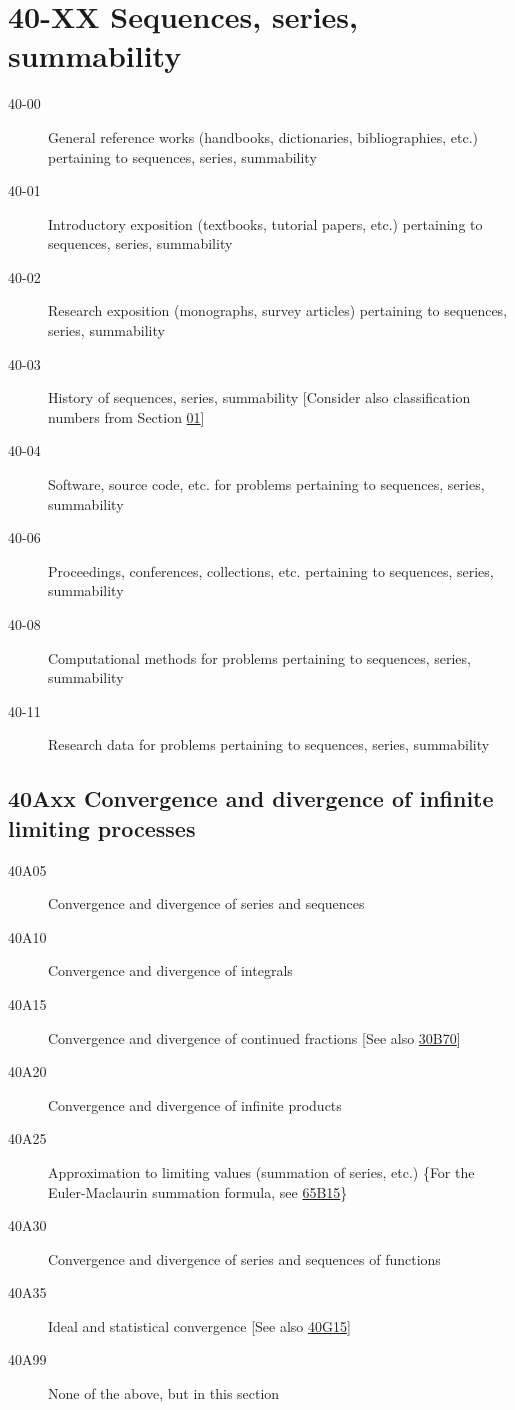\documentclass[letterpaper]{article}
\begin{document}
\section*{40-XX Sequences, series, summability }\label{40-XX}
\begin{description}
\item [40-00]\label{40-00} General reference works (handbooks, dictionaries, bibliographies, etc.) pertaining to sequences, series, summability
\item [40-01]\label{40-01} Introductory exposition (textbooks, tutorial papers, etc.) pertaining to sequences, series, summability
\item [40-02]\label{40-02} Research exposition (monographs, survey articles) pertaining to sequences, series, summability
\item [40-03]\label{40-03} History of sequences, series, summability [Consider also classification numbers from Section \hyperref[01-XX]{01}]
\item [40-04]\label{40-04} Software, source code, etc. for problems pertaining to sequences, series, summability
\item [40-06]\label{40-06} Proceedings, conferences, collections, etc. pertaining to sequences, series, summability
\item [40-08]\label{40-08} Computational methods for problems pertaining to sequences, series, summability
\item [40-11]\label{40-11} Research data for problems pertaining to sequences, series, summability
\end{description}
\subsection*{40Axx  Convergence and divergence of infinite limiting processes }\label{40Axx}
\begin{description}  
\item [40A05]\label{40A05} Convergence and divergence of series and sequences
\item [40A10]\label{40A10} Convergence and divergence of integrals
\item [40A15]\label{40A15} Convergence and divergence of continued fractions [See also \hyperref[30B70]{30B70}]
\item [40A20]\label{40A20} Convergence and divergence of infinite products
\item [40A25]\label{40A25} Approximation to limiting values (summation of series, etc.) \{For the Euler-Maclaurin summation formula, see \hyperref[65B15]{65B15}\}
\item [40A30]\label{40A30} Convergence and divergence of series and sequences of functions
\item [40A35]\label{40A35} Ideal and statistical convergence [See also \hyperref[40G15]{40G15}]
\item [40A99]\label{40A99} None of the above, but in this section
\end{description}
\end{document}
